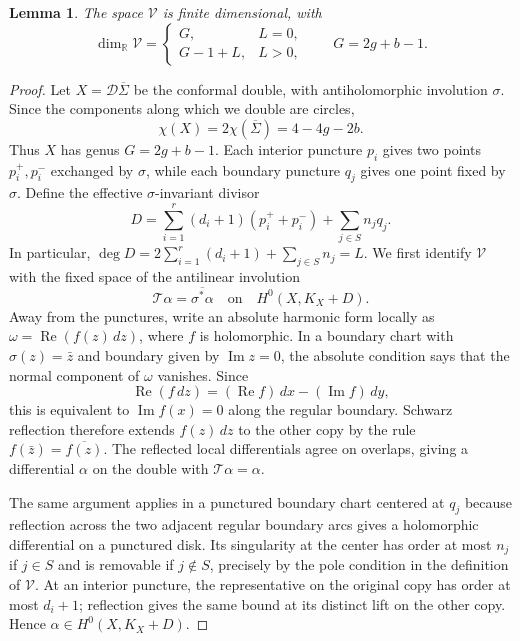\documentclass[11pt]{amsart}
\numberwithin{equation}{section}
\newtheorem{lemma}[theorem]{Lemma}
\theoremstyle{definition}
\theoremstyle{remark}
\newcommand{\R}{\mathbb R}
\newcommand{\Sigmabar}{\overline\Sigma}
\DeclareMathOperator{\Rea}{Re}
\DeclareMathOperator{\Ima}{Im}
\begin{document}
\begin{lemma}\label{lem:meromorphic-dimension}
The space $\mathcal V$ is finite dimensional, with
\begin{equation}\label{eq:meromorphic-dimension}
\dim_{\R}\mathcal V=
\begin{cases}
G,&L=0,\\
G-1+L,&L>0,
\end{cases}
\qquad G=2g+b-1.
\end{equation}
\end{lemma}

\begin{proof}
Let $X=\mathcal D\Sigmabar$ be the conformal double, with
antiholomorphic involution $\sigma$. Since the components along which
we double are circles,
\[
\chi(X)=2\chi(\Sigmabar)=4-4g-2b.
\]
Thus $X$ has genus $G=2g+b-1$. Each interior puncture $p_i$
gives two points $p_i^+,p_i^-$ exchanged by $\sigma$, while each
boundary puncture $q_j$ gives one point fixed by $\sigma$. Define
the effective $\sigma$-invariant divisor
\[
D=\sum_{i=1}^r(d_i+1)(p_i^++p_i^-)
  +\sum_{j\in S}n_jq_j.
\]
In particular,
\(
\deg D
=2\sum_{i=1}^r(d_i+1)+\sum_{j\in S}n_j=L.
\)
We first identify $\mathcal V$ with the fixed space of the
antilinear involution
\[
\mathcal T\alpha=\overline{\sigma^*\alpha}
\quad\text{on}\quad H^0(X,K_X+D).
\]
Away from the punctures, write an absolute harmonic form locally
as $\omega=\Rea(f(z)\,dz)$, where $f$ is holomorphic. In a boundary
chart with $\sigma(z)=\bar z$ and boundary given by $\Ima z=0$, the
absolute condition says that the normal component of $\omega$
vanishes. Since
\[
\Rea(f\,dz)=(\Rea f)\,dx-(\Ima f)\,dy,
\]
this is equivalent to $\Ima f(x)=0$ along the regular boundary.
Schwarz reflection therefore extends $f(z)\,dz$ to the other copy
by the rule $f(\bar z)=\overline{f(z)}$. The reflected local
differentials agree on overlaps, giving a differential $\alpha$
on the double with $\mathcal T\alpha=\alpha$.

The same argument applies in a punctured boundary chart centered
at $q_j$ because reflection across the two adjacent regular boundary
arcs gives a holomorphic differential on a punctured disk. Its
singularity at the center has order at most $n_j$ if $j\in S$
and is removable if $j\notin S$, precisely by the pole condition
in the definition of $\mathcal V$. At an interior puncture, the
representative on the original copy has order at most $d_i+1$;
reflection gives the same bound at its distinct lift on the other
copy. Hence $\alpha\in H^0(X,K_X+D)$.


\end{proof}
\end{document}
